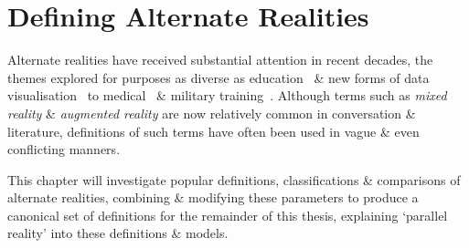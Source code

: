 


\section{Defining Alternate Realities}

Alternate realities have received substantial attention in recent decades, the themes explored for purposes as diverse as education~\cite{Warburton2009} \& new forms of data visualisation~\cite{Coleman2009} to medical~\cite{TenEyck2011} \& military training~\cite{Qiu2009}. Although terms such as \textit{mixed reality} \& \textit{augmented reality} are now relatively common in conversation \& literature, definitions of such terms have often been used in vague \& even conflicting manners.

This chapter will investigate popular definitions, classifications \& comparisons of alternate realities, combining \& modifying these parameters to produce a canonical set of definitions for the remainder of this thesis, explaining `parallel reality' into these definitions \& models.

